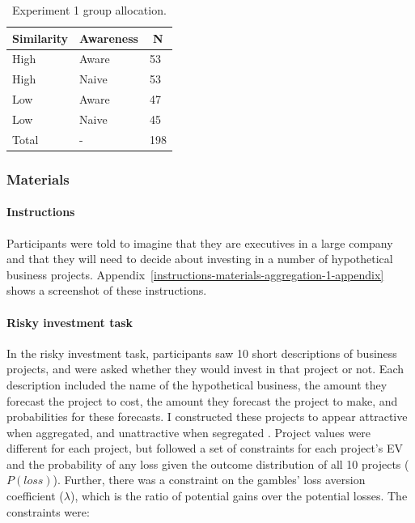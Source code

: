 \documentclass[a4paper, nobind, dvipsnames]{templates/ociamthesis}
\theoremstyle{definition}
\theoremstyle{definition}
\theoremstyle{definition}
\theoremstyle{definition}
\theoremstyle{remark}
\begin{document}
\begin{table}[tbp]

\begin{center}
\begin{threeparttable}

\caption{\label{tab:condition-allocation-aggregation-1}Experiment 1 group allocation.}

\begin{tabular}{lll}
\toprule
Similarity & \multicolumn{1}{c}{Awareness} & \multicolumn{1}{c}{N}\\
\midrule
High & Aware & 53\\
High & Naive & 53\\
Low & Aware & 47\\
Low & Naive & 45\\
Total & - & 198\\
\bottomrule
\end{tabular}

\end{threeparttable}
\end{center}

\end{table}

\hypertarget{materials}{%
\subsubsection{Materials}\label{materials}}

\hypertarget{instructions-materials-aggregation-1}{%
\paragraph{Instructions}\label{instructions-materials-aggregation-1}}

Participants were told to imagine that they are executives in a large company
and that they will need to decide about investing in a number of hypothetical
business projects. Appendix~\ref{instructions-materials-aggregation-1-appendix}
shows a screenshot of these instructions.

\hypertarget{task-aggregation-1}{%
\paragraph{Risky investment task}\label{task-aggregation-1}}

In the risky investment task, participants saw 10 short descriptions of business
projects, and were asked whether they would invest in that project or not. Each
description included the name of the hypothetical business, the amount they
forecast the project to cost, the amount they forecast the project to make, and
probabilities for these forecasts. I constructed these projects to appear
attractive when aggregated, and unattractive when segregated \autocite[see][]{langer2001}.
Project values were different for each project, but followed a set of
constraints for each project's EV and the probability of any loss given the
outcome distribution of all 10 projects (\(P(loss)\)). Further, there was a
constraint on the gambles' loss aversion coefficient (\(\lambda\)), which is the
ratio of potential gains over the potential losses. The constraints were:
\end{document}
